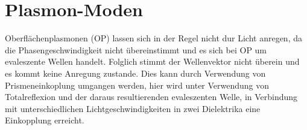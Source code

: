 
\section{Plasmon-Moden}

Oberflächenplasmonen (OP) lassen sich in der Regel nicht dur Licht anregen, da die Phasengeschwindigkeit nicht übereinstimmt und es sich bei OP um evaleszente Wellen handelt. Folglich stimmt der Wellenvektor nicht überein und es kommt keine Anregung zustande. Dies kann durch Verwendung von Prismeneinkoplung umgangen werden, hier wird unter Verwendung von Totalreflexion und der daraus resultierenden evaleszenten Welle, in Verbindung mit unterschiedlichen Lichtgeschwindigkeiten in zwei Dielektrika eine Einkopplung erreicht.